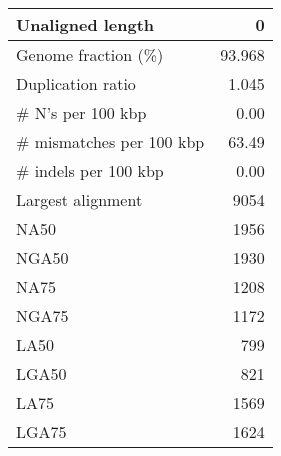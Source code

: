 \documentclass[12pt,a4paper]{article}
\begin{document}
\begin{table}[ht]
\begin{center}
\begin{tabular}{|l*{1}{|r}|}
Unaligned length & 0 \\ \hline
Genome fraction (\%) & 93.968 \\ \hline
Duplication ratio & 1.045 \\ \hline
\# N's per 100 kbp & 0.00 \\ \hline
\# mismatches per 100 kbp & 63.49 \\ \hline
\# indels per 100 kbp & 0.00 \\ \hline
Largest alignment & 9054 \\ \hline
NA50 & 1956 \\ \hline
NGA50 & 1930 \\ \hline
NA75 & 1208 \\ \hline
NGA75 & 1172 \\ \hline
LA50 & 799 \\ \hline
LGA50 & 821 \\ \hline
LA75 & 1569 \\ \hline
LGA75 & 1624 \\ \hline
\end{tabular}
\end{center}
\end{table}
\end{document}
